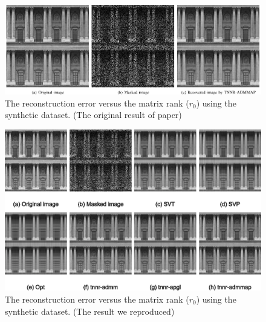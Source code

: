 \documentclass{article}
\begin{document}
{\begin{figure}[htbp]
	\centering
	\includegraphics[width=1\textwidth]{./assets/ori-fig4.eps}
	\caption{The reconstruction error versus the matrix rank ($r_0$) using the synthetic dataset. (The original result of paper)}
	\label{fig4ori}
\end{figure}
\begin{figure}[htbp]
	\centering
	\includegraphics[width=1\textwidth]{./assets/fig4.eps}
	\caption{The reconstruction error versus the matrix rank ($r_0$) using the synthetic dataset. (The result we reproduced)}
	\label{fig4}
\end{figure}

}
\end{document}
